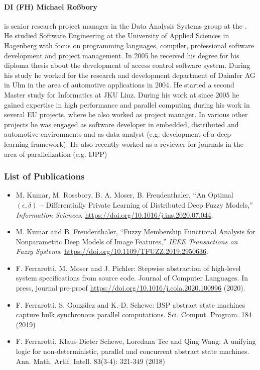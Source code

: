 \documentclass[a4paper,11pt]{article}
\begin{document}
\paragraph{DI (FH) Michael Roßbory} is senior research project manager in the Data Analysis Systems group at the \SCCHshort{}. He studied Software Engineering at the University of Applied Sciences in Hagenberg with focus on programming languages, compiler, professional software development and project management. In 2005 he received his degree for his diploma thesis about the development of access control software system. During his study he worked for the research and development department of Daimler AG in Ulm in the area of automotive applications in 2004. He started a second Master study for Informatics at JKU Linz. During his work at \SCCHshort{} since 2005 he gained expertise in high performance and parallel computing during his work in several EU projects, where he also worked as project manager. In various other projects he was engaged as software developer in embedded, distributed and automotive environments and as data analyst (e.g. development of a deep learning framework). He also recently worked as a reviewer for journals in the area of parallelization (e.g. IJPP)

\subsubsection*{List of Publications}

\begin{itemize}
\item M. Kumar, M. Rossbory, B. A. Moser, B. Freudenthaler, ``An Optimal $(\epsilon,\delta)-$Differentially Private Learning of Distributed Deep Fuzzy Models,'' \emph{Information Sciences}, \url{https://doi.org/10.1016/j.ins.2020.07.044}{}. 
\item M. Kumar and B. Freudenthaler, ``Fuzzy Membership Functional Analysis for Nonparametric Deep Models of Image Features,'' \emph{IEEE Transactions on Fuzzy Systems}, \url{https://doi.org/10.1109/TFUZZ.2019.2950636}{}.
\item F. Ferrarotti, M. Moser and J. Pichler: Stepwise abstraction of high-level system specifications from source code. Journal of Computer Languages. In press, journal pre-proof \url{https://doi.org/10.1016/j.cola.2020.100996} (2020).
\item F. Ferrarotti, S. González and K.-D. Schewe: BSP abstract state machines capture bulk synchronous parallel computations. Sci. Comput. Program. 184 (2019)
\item F. Ferrarotti, Klaus-Dieter Schewe, Loredana Tec and Qing Wang: A unifying logic for non-deterministic, parallel and concurrent abstract state machines. Ann. Math. Artif. Intell. 83(3-4): 321-349 (2018)

\end{itemize}
\end{document}
